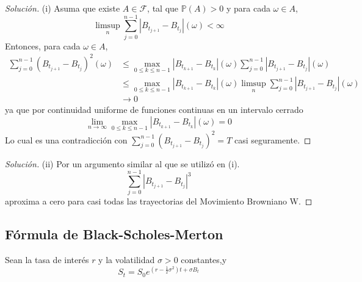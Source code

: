 \documentclass[11pt,notitlepage]{article}
\newenvironment{solucion}
  {\begin{proof}[Solución]}
  {\end{proof}}
\begin{document}
\begin{solucion}
(i) Asuma que existe $A \in \mathcal{F}$, tal que $\mathbb{P}(A)>0$ y para cada $\omega \in A$,
\begin{equation*}
    \limsup_{n}\sum_{j=0}^{n-1}|B_{t_{j+1}}-B_{t_{j}}|(\omega)<\infty
\end{equation*}
\hspace{0.3cm} Entonces, para cada $\omega \in A$,
\begin{align*}
    \sum_{j=0}^{n-1}(B_{t_{j+1}}-B_{t_{j}})^{2}(\omega) &\leq \max_{0\leq k\leq n-1} |B_{t_{k+1}}-B_{t_{k}}|(\omega)\sum_{j=0}^{n-1}|B_{t_{j+1}}-B_{t_{j}}|(\omega)\\
    &\leq \max_{0\leq k\leq n-1} |B_{t_{k+1}}-B_{t_{k}}|(\omega)\limsup_{n}\sum_{j=0}^{n-1}|B_{t_{j+1}}-B_{t_{j}}|(\omega)\\
    &\rightarrow 0
\end{align*}
\hspace{0.3cm} ya que por continuidad uniforme de funciones continuas en un intervalo cerrado
\begin{equation*}
    \lim_{n\rightarrow \infty} \max_{0\leq k\leq n-1}|B_{t_{k+1}}-B_{t_{k}}|(\omega)=0
\end{equation*}
\hspace{0.3cm} Lo cual es una contradicción con $\sum\nolimits_{j=0}^{n-1}(B_{t_{j+1}}-B_{t_{j}})^{2}=T$ casi seguramente.
\end{solucion}

\begin{solucion}
 (ii) Por un argumento similar al que se utilizó en (i).
\begin{equation*}
    \sum_{j=0}^{n-1}|B_{t_{j+1}}-B_{t_{j}}|^{3}
\end{equation*}
\hspace{0.3cm} aproxima a cero para casi todas las trayectorias del Movimiento Browniano W.
\end{solucion}


\subsection{Fórmula de Black-Scholes-Merton} Sean la tasa de interés $r$ y la volatilidad $\sigma>0$ constantes,y
\begin{equation*}
    S_t=S_0e^{(r-\frac{1}{2}\sigma^{2})t+\sigma B_t}
\end{equation*}
\end{document}
